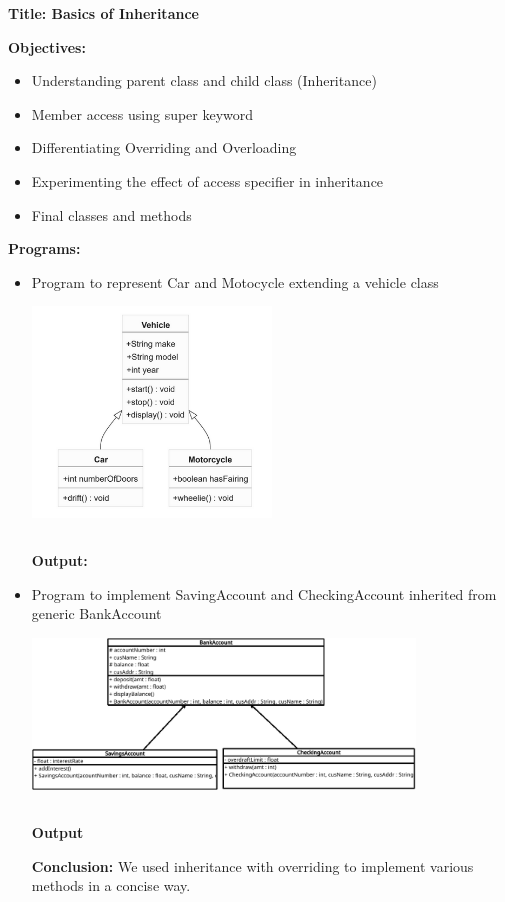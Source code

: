 \documentclass{book}
\begin{document}
{\Huge \textbf{Title: Basics of Inheritance}}
\\
\par
{\large
\textbf{Objectives: }}
\begin{itemize}
    \item{Understanding parent class and child class (Inheritance)}
    \item{Member access using super keyword}
    \item{Differentiating Overriding and Overloading}
    \item{Experimenting the effect of access specifier in inheritance}
    \item{Final classes and methods}
\end{itemize}
\par
\textbf{Programs:}
\begin{itemize}
    \item{Program to represent Car and Motocycle extending a vehicle class}
    \par
    \begin{center}
    \includegraphics[width=0.5\textwidth,keepaspectratio]{vehicleClassDiagram}
    \end{center}
    \par
    \inputminted{java}{VehicleApp.java}
    \textbf{Output:}
    

    \item{Program to implement SavingAccount and CheckingAccount inherited from generic BankAccount}
    \begin{center}
        \includegraphics[width=0.8\textwidth,keepaspectratio]{BankClassDiagram}
    \end{center}
    \inputminted{java}{Bank.java}
    \textbf{Output}
    
    \par
    \textbf{Conclusion:} We used inheritance with overriding to implement various methods in a concise way.
\end{itemize}
\end{document}
